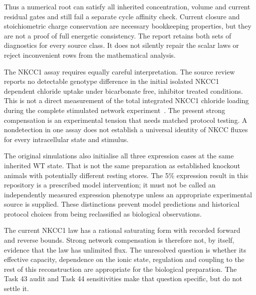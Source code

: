 Thus a numerical root can satisfy all inherited concentration, volume and current residual gates and still fail a separate cycle affinity check. Current closure and stoichiometric charge conservation are necessary bookkeeping properties, but they are not a proof of full energetic consistency. The report retains both sets of diagnostics for every source class. It does not silently repair the scalar laws or reject inconvenient rows from the mathematical analysis.

The NKCC1 assay requires equally careful interpretation. The source review reports no detectable genotype difference in the initial isolated NKCC1 dependent chloride uptake under bicarbonate free, inhibitor treated conditions. This is not a direct measurement of the total integrated NKCC1 chloride loading during the complete stimulated network experiment~\citep{m44Pena2015}. The present strong compensation is an experimental tension that needs matched protocol testing. A nondetection in one assay does not establish a universal identity of NKCC fluxes for every intracellular state and stimulus.

The original simulations also initialise all three expression cases at the same inherited WT state. That is not the same preparation as established knockout animals with potentially different resting stores. The 5\% expression result in this repository is a prescribed model intervention; it must not be called an independently measured expression phenotype unless an appropriate experimental source is supplied. These distinctions prevent model predictions and historical protocol choices from being reclassified as biological observations.

The current NKCC1 law has a rational saturating form with recorded forward and reverse bounds. Strong network compensation is therefore not, by itself, evidence that the law has unlimited flux. The unresolved question is whether its effective capacity, dependence on the ionic state, regulation and coupling to the rest of this reconstruction are appropriate for the biological preparation. The Task 43 audit and Task 44 sensitivities make that question specific, but do not settle it.

